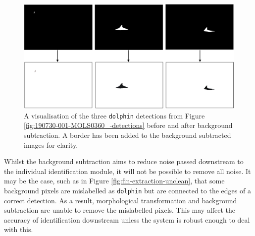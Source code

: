 \begin{figure}
	\begin{center}
		\includegraphics[scale=0.45]{Chapter3/figs/190730-001-MOLS0360_-bg-subtraction.png}
	\end{center}
	\caption[A visualisation of the three \texttt{dolphin} detections from Figure \ref{fig:190730-001-MOLS0360_-detections} before and after background subtraction.]{A visualisation of the three \texttt{dolphin} detections from Figure \ref{fig:190730-001-MOLS0360_-detections} before and after background subtraction. A border has been added to the background subtracted images for clarity.}
	\label{fig:190730-001-MOLS0360_-bg-subtraction}
\end{figure}

Whilst the background subtraction aims to reduce noise passed downstream to the individual identification module, it will not be possible to remove all noise. It may be the case, such as in Figure \ref{fig:fin-extraction-unclean}, that some background pixels are mislabelled as \texttt{dolphin} but are connected to the edges of a correct detection. As a result, morphological transformation and background subtraction are unable to remove the mislabelled pixels. This may affect the accuracy of identification downstream unless the system is robust enough to deal with this.

